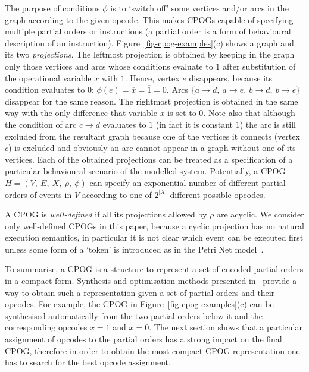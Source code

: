 The purpose of conditions $\phi$ is to `switch off' some vertices
and/or arcs in the graph according to the given opcode. This makes
CPOGs capable of specifying multiple partial orders or instructions
(a partial order is a form of behavioural description of an instruction).
Figure~\ref{fig-cpog-examples}(c) shows a graph and its two \emph{projections}.
The leftmost projection is obtained by keeping in the graph only those
vertices and arcs whose conditions evaluate to $1$ after substitution
of the operational variable $x$ with $1$. Hence, vertex $e$ disappears,
because its condition evaluates to $0$: $\phi(e)=\overline{x}=\overline{1}=0$.
Arcs $\{a\rightarrow d,\ a\rightarrow e,\ b\rightarrow d,\ b\rightarrow e\}$
disappear for the same reason. The rightmost projection is obtained
in the same way with the only difference that variable $x$ is set
to $0$. Note also that although the condition of arc $c\rightarrow d$
evaluates to $1$ (in fact it is constant $1$) the arc is still excluded
from the resultant graph because one of the vertices it connects (vertex
$c$) is excluded and obviously an arc cannot appear in a graph without
one of its vertices. Each of the obtained projections can be treated
as a specification of a particular behavioural scenario of the modelled
system. Potentially, a CPOG $H=(V,\ E,\ X,\ \rho,\ \phi)$ can specify
an exponential number of different partial orders of events in $V$
according to one of $2^{|X|}$ different possible opcodes.

A CPOG is \emph{well-defined} if all its projections allowed by
$\rho$ are acyclic. We consider only well-defined CPOGs in this paper,
because a cyclic projection has no natural execution semantics, in
particular it is not clear which event can be executed first unless
some form of a \textquoteleft{}token\textquoteright{} is introduced
as in the Petri Net model~\cite{2002_cortadella_book}.

To summarise, a CPOG is a structure to represent a set of encoded
partial orders in a compact form. Synthesis and optimisation methods
presented in~\cite{2010_mokhov_ieee} provide a way to obtain such
a representation given a set of partial orders and their opcodes.
For example, the CPOG in Figure~\ref{fig-cpog-examples}(c) can be
synthesised automatically from the two partial orders below it and
the corresponding opcodes $x=1$ and $x=0$. The next section shows
that a particular assignment of opcodes to the partial orders has
a strong impact on the final CPOG, therefore in order to obtain the
most compact CPOG representation one has to search for the best opcode
assignment.

